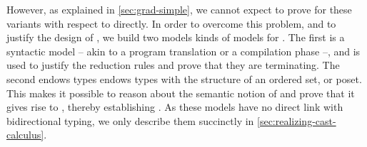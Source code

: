 However, as explained in \cref{sec:grad-simple}, we cannot expect to prove 
for these  variants with respect to  directly.
In order to overcome this problem, and to justify the design of ,
we build two models kinds of models for . The first%
 is a syntactic model
 – akin to a program translation or a compilation phase –,
and is used to justify the reduction rules and prove that they are terminating.
The second%
endows types endows types with the structure of an ordered set, or poset. This makes it
possible to reason about the semantic notion of  and prove that it gives rise to ,
thereby establishing .
%
As these models have no direct link with bidirectional typing, we only describe them
succinctly in \cref{sec:realizing-cast-calculus}.